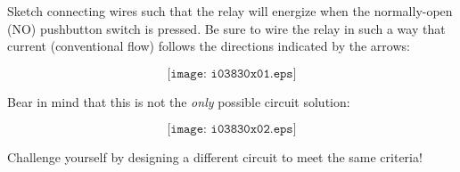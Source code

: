 

Sketch connecting wires such that the relay will energize when the normally-open (NO) pushbutton switch is pressed.  Be sure to wire the relay in such a way that current (conventional flow) follows the directions indicated by the arrows:

$$\texttt{[image: i03830x01.eps]}$$







Bear in mind that this is not the {\it only} possible circuit solution:

$$\texttt{[image: i03830x02.eps]}$$

Challenge yourself by designing a different circuit to meet the same criteria! 











